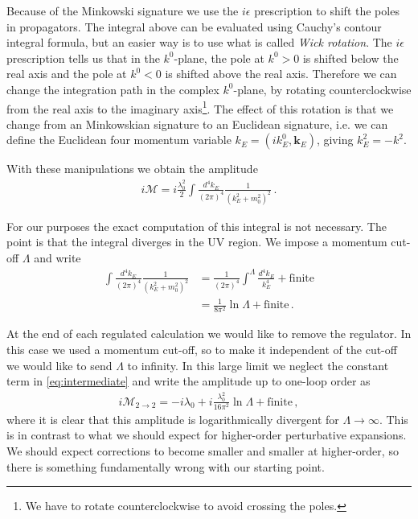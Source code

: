Because of the Minkowski signature we use the $i\epsilon$ prescription to shift the poles in propagators. The integral above can be evaluated using Cauchy's contour integral formula, but an easier way is to use what is called \emph{Wick rotation}. The $i\epsilon$ prescription tells us that in the $k^{0}$-plane, the pole at $k^{0}>0$ is shifted below the real axis and the pole at $k^{0}<0$ is shifted above the real axis. Therefore we can change the integration path in the complex $k
^{0}$-plane, by rotating counterclockwise from the real axis to the imaginary axis\footnote{We have to rotate counterclockwise to avoid crossing the poles.}. The effect of this rotation is that we change from an Minkowskian signature to an Euclidean signature, i.e. we can define the Euclidean four momentum variable $k_{E}=(ik_{E}
^{0},\mathbf{k}_{E})$, giving $k_{E}^{2}=-k^{2}$. 

With these manipulations we obtain the amplitude
\begin{align}
    i\mathcal{M}=i\frac{\lambda_{0}^{2}}{2}\int\frac{d^{4}k_E}{(2\pi)^{4}}\frac{1}{(k_{E}^{2}+m_{0}^{2})^{2}}\,.
\end{align}

For our purposes the exact computation of this integral is not necessary. The point is that the integral diverges in the UV region. We impose a momentum cut-off $\Lambda$ and write
\begin{align}\label{eq:intermediate}
    \int\frac{d^{4}k_E}{(2\pi)^{4}}\frac{1}{(k_{E}^{2}+m_{0}^{2})^{2}}&=\frac{1}{(2\pi)^{4}}\int^{\Lambda}\frac{d^{4}k_{E}}{k_{E}^{4}}+\text{finite}
    \\
    &=\frac{1}{8\pi^{2}}\ln\Lambda+\text{finite}\,.
\end{align}

At the end of each regulated calculation we would like to remove the regulator. In this case we used a momentum cut-off, so to make it independent of the cut-off we would like to send $\Lambda$ to infinity. In this large limit we neglect the constant term in \cref{eq:intermediate} and write the amplitude up to one-loop order as
\begin{align}\label{eq:up to one loop amplitude phi-4}
    i\mathcal{M}_{2\rightarrow 2}=-i\lambda_{0}+i\frac{\lambda_{0}^{2}}{16\pi^{2}}\ln\Lambda+\text{finite}\,,
\end{align}
where it is clear that this amplitude is logarithmically divergent for $\Lambda\rightarrow\infty$. This is in contrast to what we should expect for higher-order perturbative expansions. We should expect corrections to become smaller and smaller at higher-order, so there is something fundamentally wrong with our starting point. 

